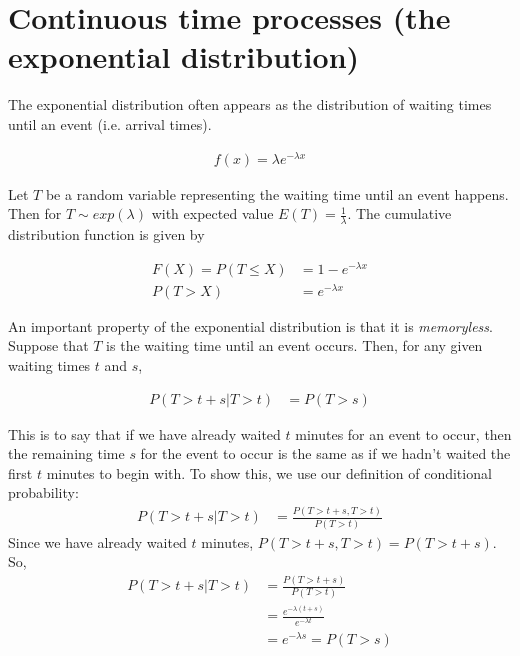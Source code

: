 \documentclass[12pt]{report}
\begin{document}

\maketitle

\vspace*{.1in}




\section{Continuous time processes (the exponential distribution)}
The exponential distribution often appears as the distribution of waiting times until an event (i.e. arrival times). 

\begin{align*}
f(x) = \lambda e^{-\lambda x}
\end{align*}

Let $T$ be a random variable representing the waiting time until an event happens. Then for $T\sim exp(\lambda)$ with expected value $E(T) = \frac{1}{\lambda}$. The cumulative distribution function is given by

\begin{align*}
F(X) = P(T\le X) &= 1-e^{-\lambda x}\\
P(T > X) &= e^{-\lambda x}
\end{align*}

An important property of the exponential distribution is that it is \textit{memoryless}. Suppose that $T$ is the waiting time until an event occurs. Then, for any given waiting times $t$ and $s$,

\begin{align*}
P(T > t+s | T>t ) &= P(T>s)
\end{align*}

This is to say that if we have already waited $t$ minutes for an event to occur, then the remaining time $s$ for the event to occur is the same as if we hadn't waited the first $t$ minutes to begin with. To show this, we use our definition of conditional probability:
\begin{align*}
P(T > t+s | T>t ) &= \frac{P(T > t+s , T>t )}{P(T>t)}
\end{align*}
Since we have already waited $t$ minutes, $P(T > t+s , T>t ) = P(T > t+s)$. So,
\begin{align*}
P(T > t+s | T>t ) &= \frac{P(T > t+s )}{P(T>t)}\\
&= \frac{e^{-\lambda(t+s)}}{ e^{-\lambda t} }\\
&= e^{-\lambda s} = P(T>s)
\end{align*}
\end{document}
